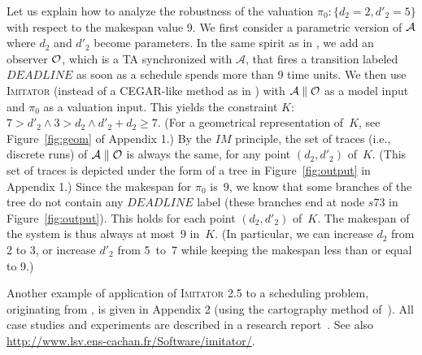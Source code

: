 \documentclass{llncs}
\newcommand{\A}{\mathcal{A}}
\newcommand{\Ko}{K}
\newcommand{\pio}{\pi_0}
\newcommand{\IM}{\mathit{IM}}
\newcommand{\imitator}{\textsc{Imitator}}
\begin{document}
Let us explain how to analyze the robustness of the
valuation $\pio:\{d_2=2,d'_2=5\}$ with respect to the makespan value 9.
We first consider a parametric version of ${\cal A}$ where
$d_2$ and $d'_2$ become parameters.
In the same spirit as in \cite{cpr08},
we add an observer ${\cal O}$, which is a TA
synchronized with $\A$, that fires a transition labeled $\mathit{DEADLINE}$ as soon as a schedule spends more than 9 time units.
We then use \imitator{} (instead of a CEGAR-like method
as in \cite{cpr08}) with $\A \parallel {\cal O}$ as a model input
and $\pio$ as a valuation input.
This yields the constraint $\Ko$:  $7 > d'_2 \wedge 3 > d_2 \wedge d'_2 + d_2 \geq 7$.
(For a geometrical representation of~$\Ko$, see Figure~\ref{fig:geom} of Appendix 1.)
By the $\IM$ principle, the set of traces (i.e., discrete runs) of
$\A \parallel {\cal O}$ is always the same,
for any point $(d_2,d'_2)$ of~$\Ko$.
(This set of traces is depicted under the form of a tree in Figure~\ref{fig:output} in Appendix 1.)
Since the makespan for $\pio$ is~9,
we know that some branches of the tree do not contain
any $\mathit{DEADLINE}$ label (these branches end at node $s73$
in Figure~\ref{fig:output}).
This holds for each point $(d_2,d'_2)$ of~$\Ko$.
The makespan of the system is thus always at most~9 in~$\Ko$. (In particular, we can increase $d_2$ from 2 to 3, or increase $d'_2$ from 5~to~7
while keeping the makespan less than or equal to 9.)




Another example of application of \imitator{} 2.5 to a scheduling problem, originating from \cite{bb04}, is given in Appendix 2 (using 
the cartography method of~\cite{af10}). 
All case studies and experiments %
are described in a research report~\cite{soulat12}. See also \url{http://www.lsv.ens-cachan.fr/Software/imitator/}.
\end{document}
